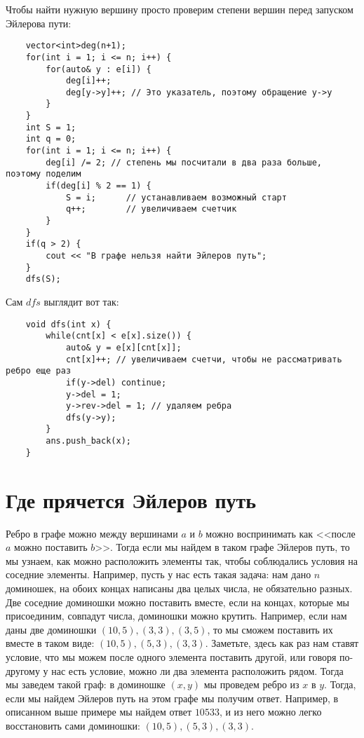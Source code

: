 \documentclass{article}
\begin{document}
Чтобы найти нужную вершину просто проверим степени вершин перед запуском Эйлерова пути:
\begin{verbatim}
    vector<int>deg(n+1);
    for(int i = 1; i <= n; i++) {
        for(auto& y : e[i]) {
            deg[i]++;
            deg[y->y]++; // Это указатель, поэтому обращение y->y
        }
    }
    int S = 1;
    int q = 0;
    for(int i = 1; i <= n; i++) {
        deg[i] /= 2; // степень мы посчитали в два раза больше, поэтому поделим
        if(deg[i] % 2 == 1) {
            S = i;      // устанавливаем возможный старт
            q++;        // увеличиваем счетчик
        }
    }
    if(q > 2) {
        cout << "В графе нельзя найти Эйлеров путь";
    }
    dfs(S);
\end{verbatim}

Сам $dfs$ выглядит вот так:
\begin{verbatim}
    void dfs(int x) {
        while(cnt[x] < e[x].size()) {
            auto& y = e[x][cnt[x]];
            cnt[x]++; // увеличиваем счетчи, чтобы не рассматривать ребро еще раз
            if(y->del) continue;
            y->del = 1;
            y->rev->del = 1; // удаляем ребра
            dfs(y->y);
        }
        ans.push_back(x);
    }
\end{verbatim}


\section{Где прячется Эйлеров путь}

Ребро в графе можно между вершинами $a$ и $b$ можно воспринимать как <<после $a$ можно поставить $b$>>. Тогда если мы найдем в таком графе Эйлеров путь, то мы узнаем, как можно расположить элементы так, чтобы соблюдались условия на соседние элементы. Например, пусть у нас есть такая задача: нам дано $n$ доминошек, на обоих концах написаны два целых числа, не обязательно разных. Две соседние доминошки можно поставить вместе, если на концах, которые мы присоединим, совпадут числа, доминошки можно крутить. Например, если нам даны две доминошки $(10, 5), (3,3), (3,5)$, то мы сможем поставить их вместе в таком виде: $(10,5), (5,3), (3,3)$. Заметьте, здесь как раз нам ставят условие, что мы можем после одного элемента поставить другой, или говоря по-другому у нас есть условие, можно ли два элемента расположить рядом. Тогда мы заведем такой граф: в доминошке $(x,y)$ мы проведем ребро из $x$ в $y$. Тогда, если мы найдем Эйлеров путь на этом графе мы получим ответ. Например, в описанном выше примере мы найдем ответ $10 5 3 3$, и из него можно легко восстановить сами доминошки: $(10,5), (5,3), (3,3)$.
\end{document}
